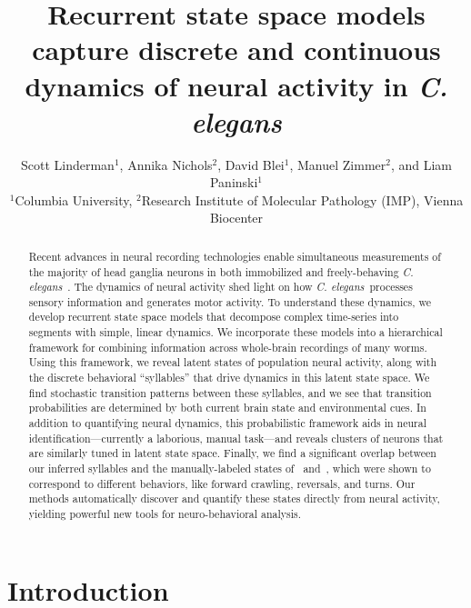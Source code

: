 \documentclass[11pt]{article}
\title{Recurrent state space models capture discrete and continuous dynamics of neural activity in \textit{C. elegans}}
\author{Scott Linderman$^{\text{1}}$,
  Annika Nichols$^{\text{2}}$,
  David Blei$^{\text{1}}$,
  Manuel Zimmer$^{\text{2}}$,
  and
  Liam Paninski$^{\text{1}}$
  \\
  $^{\text{1}}$Columbia University,
  $^{\text{2}}$Research Institute of Molecular Pathology (IMP), Vienna Biocenter
}
\newcommand{\celegans}{\textit{C. elegans}}
\begin{document}
\doublespacing

\maketitle

\begin{abstract}
  Recent advances in neural recording technologies enable
  simultaneous measurements of the majority of head ganglia neurons in
  both immobilized and freely-behaving
  \celegans~\citep{schrodel2013brain, prevedel2014simultaneous,
    nguyen2016whole}.  The dynamics of neural activity shed light on
  how \celegans~processes sensory information and generates motor
  activity.  To understand these dynamics, we develop recurrent state
  space models that decompose complex time-series into segments with
  simple, linear dynamics. We incorporate these models into a
  hierarchical framework for combining information across whole-brain
  recordings of many worms.  Using this framework, we reveal latent
  states of population neural activity, along with the discrete
  behavioral ``syllables'' that drive dynamics in this latent state
  space.  We find stochastic transition patterns between these
  syllables, and we see that transition probabilities are determined
  by both current brain state and environmental cues.  In
  addition to quantifying neural dynamics, this probabilistic
  framework aids in neural identification---currently a laborious,
  manual task---and reveals clusters of neurons that are similarly
  tuned in latent state space.  Finally, we find a significant overlap
  between our inferred syllables and the manually-labeled states
  of~\citet{kato2015global} and~\citet{nichols2017global}, which were
  shown to correspond to different behaviors, like forward crawling,
  reversals, and turns. Our methods automatically discover and
  quantify these states directly from neural
  activity, yielding powerful new tools for neuro-behavioral analysis.
\end{abstract}

\clearpage

\section*{Introduction}
\end{document}
